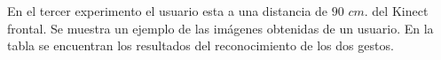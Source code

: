 
En el tercer experimento el usuario esta a una distancia de $90$ $cm.$ del Kinect frontal. Se muestra un ejemplo de las imágenes obtenidas de un usuario. En la tabla se encuentran los resultados del reconocimiento de los dos gestos.    

\begin{figure}[h!]
\centering
{}

\end{figure}
